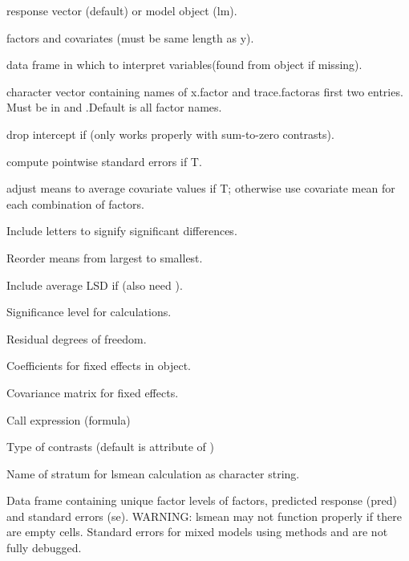 \documentclass[a4paper]{book}
\begin{document}
\begin{Arguments}
\begin{ldescription}
\item[\code{object}] response vector (default) or model object (lm).
\item[\code{...}] factors and covariates (must be same length as y).
\item[\code{data}] data frame in which to interpret variables(found from
object if missing).
\item[\code{factors}] character vector containing names of x.factor and
trace.factoras first two entries.  Must be in  and
.Default is all factor names.
\item[\code{effects}] drop intercept if  (only works properly with
sum-to-zero contrasts).
\item[\code{se.fit}] compute pointwise standard errors if T.
\item[\code{adjust.covar}] adjust means to average covariate values if
T; otherwise use covariate mean for each combination of
factors.
\item[\code{pdiff}] Include letters to signify significant differences.
\item[\code{reorder}] Reorder means from largest to smallest.
\item[\code{lsd}] Include average LSD if  (also need ).
\item[\code{level}] Significance level for  calculations.
\item[\code{rdf}] Residual degrees of freedom.
\item[\code{coef}] Coefficients for fixed effects in object.
\item[\code{cov}] Covariance matrix for fixed effects.
\item[\code{expr}] Call expression (formula)
\item[\code{contrast}] Type of contrasts (default is attribute
 of )
\item[\code{stratum}] Name of stratum for lsmean calculation as character string.
\end{ldescription}
\end{Arguments}
%
\begin{Value}
Data frame containing unique factor levels of factors, predicted
response (pred) and standard errors (se). WARNING: lsmean may not
function properly if there are empty cells. Standard errors for mixed
models using methods  and  are not fully
debugged.
\end{Value}
\end{document}
